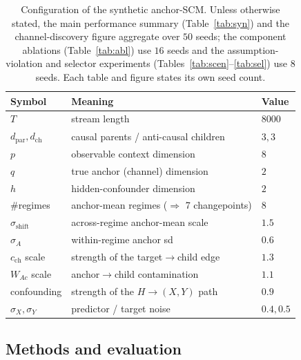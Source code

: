 \documentclass[12pt]{article}
\theoremstyle{plain}
\theoremstyle{remark}
\begin{document}
\begin{table}[htbp]
\centering
\caption{Configuration of the synthetic anchor-SCM. Unless otherwise stated, the
main performance summary (Table~\ref{tab:syn}) and the channel-discovery figure
aggregate over $50$ seeds; the component ablations (Table~\ref{tab:abl}) use $16$
seeds and the assumption-violation and selector experiments
(Tables~\ref{tab:scen}--\ref{tab:sel}) use $8$ seeds. Each table and figure states
its own seed count.}
\label{tab:scm}
\small
\begin{tabular}{lll}
\toprule
Symbol & Meaning & Value\\
\midrule
$T$ & stream length & $8000$\\
$d_{\mathrm{par}},d_{\mathrm{ch}}$ & causal parents / anti-causal children & $3,3$\\
$p$ & observable context dimension & $8$\\
$q$ & true anchor (channel) dimension & $2$\\
$h$ & hidden-confounder dimension & $2$\\
\#regimes & anchor-mean regimes ($\Rightarrow$ 7 changepoints) & $8$\\
$\sigma_{\text{shift}}$ & across-regime anchor-mean scale & $1.5$\\
$\sigma_A$ & within-regime anchor sd & $0.6$\\
$c_{\mathrm{ch}}$ scale & strength of the target$\to$child edge & $1.3$\\
$W_{Ac}$ scale & anchor$\to$child contamination & $1.1$\\
confounding & strength of the $H\to(X,Y)$ path & $0.9$\\
$\sigma_X,\sigma_Y$ & predictor / target noise & $0.4,0.5$\\
\bottomrule
\end{tabular}
\end{table}

\subsection{Methods and evaluation}\label{sec:setup}
\end{document}
